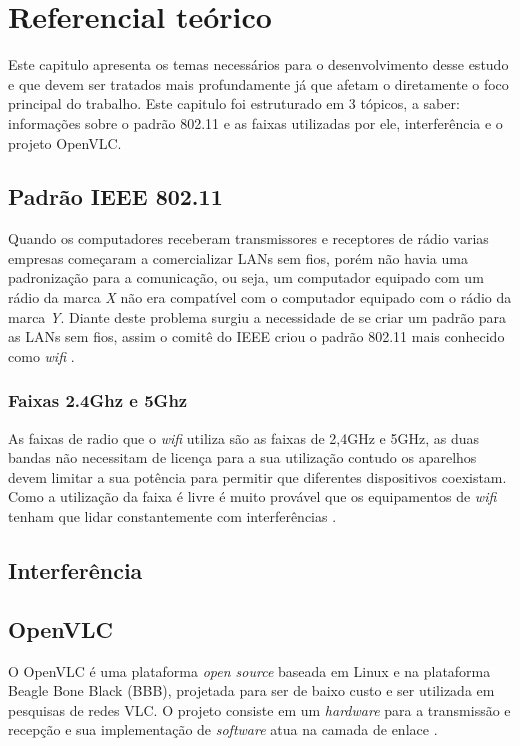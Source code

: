 \chapter{Referencial teórico}

Este capitulo apresenta os temas necessários para o desenvolvimento desse estudo e que devem ser tratados mais profundamente já que afetam o diretamente o foco principal do trabalho. Este capitulo foi estruturado em 3 tópicos, a saber: informações sobre o padrão 802.11 e as faixas utilizadas por ele, interferência e o projeto OpenVLC.

\section{Padrão IEEE 802.11}

Quando os computadores receberam transmissores e receptores de rádio varias empresas começaram a comercializar LANs sem fios, porém não havia uma padronização para a comunicação, ou seja, um computador equipado com um rádio da marca \emph{X} não era compatível com o computador equipado com o rádio da marca \emph{Y}. Diante deste problema surgiu a necessidade de se criar um padrão para as LANs sem fios, assim o comitê do IEEE criou o padrão 802.11 mais conhecido como \textit{wifi} \cite{tanenbaum}.

\subsection{Faixas 2.4Ghz e 5Ghz}

As faixas de radio que o \textit{wifi} utiliza são as faixas de 2,4GHz e 5GHz, as duas bandas não necessitam de licença para a sua utilização contudo os aparelhos devem limitar a sua potência para permitir que diferentes dispositivos coexistam. Como a utilização da faixa é livre é muito provável que os equipamentos de \textit{wifi} tenham que lidar constantemente com interferências \cite{tanenbaum}.

\section{Interferência}

\section{OpenVLC}

O OpenVLC é uma plataforma \textit{open source} baseada em  Linux e na plataforma Beagle Bone Black (BBB), projetada para ser de baixo custo e ser utilizada em pesquisas de redes VLC. O projeto consiste em um \textit{hardware} para a transmissão e recepção e sua implementação de \textit{software} atua na camada de enlace \cite{OpenVLCB}.

